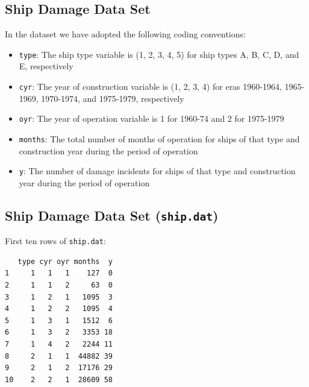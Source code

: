 \documentclass{article}\usepackage[]{graphicx}\usepackage[svgnames]{xcolor}
\makeatletter
\newenvironment{kframe}{%
 \def\at@end@of@kframe{}%
 \ifinner\ifhmode%
  \def\at@end@of@kframe{\end{minipage}}%
  \begin{minipage}{\columnwidth}%
 \fi\fi%
 \def\FrameCommand##1{\hskip\@totalleftmargin \hskip-\fboxsep
 \colorbox{shadecolor}{##1}\hskip-\fboxsep
     \hskip-\linewidth \hskip-\@totalleftmargin \hskip\columnwidth}%
 \MakeFramed {\advance\hsize-\width
   \@totalleftmargin\z@ \linewidth\hsize
   \@setminipage}}%
 {\par\unskip\endMakeFramed%
 \at@end@of@kframe}
\newenvironment{knitrout}{}{} %
\makeatother
\begin{document}
\subsection*{Ship Damage Data Set}
In the dataset we have adopted the following coding conventions:
\begin{itemize}
      \item \texttt{type}: The ship type variable is (1, 2, 3, 4, 5) for ship types A, B, C, D, and E,
            respectively
      \item \texttt{cyr}: The year of construction variable is (1, 2, 3, 4) for eras 1960-1964,
            1965-1969, 1970-1974, and 1975-1979, respectively
      \item \texttt{oyr}: The year of operation variable is 1 for 1960-74 and 2 for 1975-1979
      \item \texttt{months}: The total number of months of operation for ships of that type and
            construction year during the period of operation
      \item \texttt{y}: The number of damage incidents for ships of that type and construction
            year during the period of operation
\end{itemize}
\subsection*{Ship Damage Data Set (\texttt{ship.dat})}
\begin{Example}{}
      First ten rows of \texttt{ship.dat}:
\begin{knitrout}
\color{fgcolor}\begin{kframe}
\begin{verbatim}
   type cyr oyr months  y
1     1   1   1    127  0
2     1   1   2     63  0
3     1   2   1   1095  3
4     1   2   2   1095  4
5     1   3   1   1512  6
6     1   3   2   3353 18
7     1   4   2   2244 11
8     2   1   1  44882 39
9     2   1   2  17176 29
10    2   2   1  28609 58
\end{verbatim}
\end{kframe}
\end{knitrout}
\end{Example}
\end{document}
